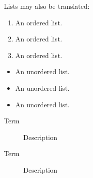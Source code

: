 Lists may also be translated:

\begin{enumerate}
  \item An ordered list.
  \item An ordered list.
  \item An ordered list.
\end{enumerate}

\begin{itemize}
  \item An unordered list.
  \item An unordered list.
  \item An unordered list.
\end{itemize}

\begin{description}
  \item[Term]
  Description
  \item[Term]
  Description
\end{description}